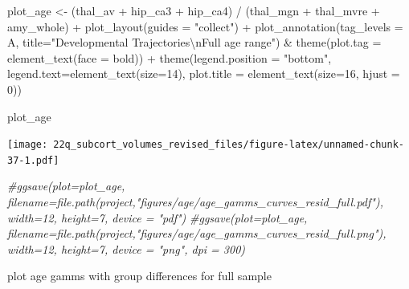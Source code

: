 \documentclass[
]{article}
\newenvironment{Shaded}{\begin{snugshade}}{\end{snugshade}}
\newcommand{\AttributeTok}[1]{\textcolor[rgb]{0.77,0.63,0.00}{#1}}
\newcommand{\CommentTok}[1]{\textcolor[rgb]{0.56,0.35,0.01}{\textit{#1}}}
\newcommand{\DecValTok}[1]{\textcolor[rgb]{0.00,0.00,0.81}{#1}}
\newcommand{\FunctionTok}[1]{\textcolor[rgb]{0.00,0.00,0.00}{#1}}
\newcommand{\NormalTok}[1]{#1}
\newcommand{\OtherTok}[1]{\textcolor[rgb]{0.56,0.35,0.01}{#1}}
\newcommand{\SpecialCharTok}[1]{\textcolor[rgb]{0.00,0.00,0.00}{#1}}
\newcommand{\StringTok}[1]{\textcolor[rgb]{0.31,0.60,0.02}{#1}}
\begin{document}
\begin{Shaded}
\begin{Highlighting}[]
\NormalTok{plot\_age }\OtherTok{\textless{}{-}}\NormalTok{ (thal\_av }\SpecialCharTok{+}\NormalTok{ hip\_ca3 }\SpecialCharTok{+}\NormalTok{ hip\_ca4) }\SpecialCharTok{/}\NormalTok{ (thal\_mgn }\SpecialCharTok{+}\NormalTok{ thal\_mvre }\SpecialCharTok{+}\NormalTok{ amy\_whole) }\SpecialCharTok{+} \FunctionTok{plot\_layout}\NormalTok{(}\AttributeTok{guides =} \StringTok{"collect"}\NormalTok{) }\SpecialCharTok{+} \FunctionTok{plot\_annotation}\NormalTok{(}\AttributeTok{tag\_levels =} \StringTok{\textquotesingle{}A\textquotesingle{}}\NormalTok{, }\AttributeTok{title=}\StringTok{"Developmental Trajectories}\SpecialCharTok{\textbackslash{}n}\StringTok{Full age range"}\NormalTok{) }\SpecialCharTok{\&}   \FunctionTok{theme}\NormalTok{(}\AttributeTok{plot.tag =} \FunctionTok{element\_text}\NormalTok{(}\AttributeTok{face =} \StringTok{\textquotesingle{}bold\textquotesingle{}}\NormalTok{)) }\SpecialCharTok{+} \FunctionTok{theme}\NormalTok{(}\AttributeTok{legend.position =} \StringTok{"bottom"}\NormalTok{, }\AttributeTok{legend.text=}\FunctionTok{element\_text}\NormalTok{(}\AttributeTok{size=}\DecValTok{14}\NormalTok{), }\AttributeTok{plot.title =} \FunctionTok{element\_text}\NormalTok{(}\AttributeTok{size=}\DecValTok{16}\NormalTok{, }\AttributeTok{hjust =} \DecValTok{0}\NormalTok{)) }

\NormalTok{plot\_age}
\end{Highlighting}
\end{Shaded}

\texttt{[image: 22q\_subcort\_volumes\_revised\_files/figure-latex/unnamed-chunk-37-1.pdf]}

\begin{Shaded}
\begin{Highlighting}[]
\CommentTok{\#ggsave(plot=plot\_age, filename=file.path(project,"figures/age/age\_gamms\_curves\_resid\_full.pdf"), width=12, height=7, device = "pdf")}
\CommentTok{\#ggsave(plot=plot\_age, filename=file.path(project,"figures/age/age\_gamms\_curves\_resid\_full.png"), width=12, height=7, device = "png", dpi = 300)}
\end{Highlighting}
\end{Shaded}

plot age gamms with group differences for full sample
\end{document}
